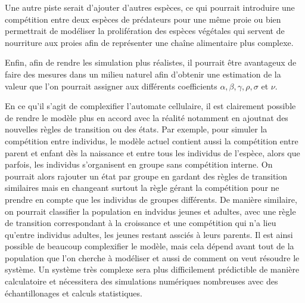 Une autre piste serait d'ajouter d'autres espèces, ce qui pourrait introduire une compétition entre deux espèces de prédateurs pour une même proie ou bien permettrait de modéliser la prolifération des espèces végétales qui servent de nourriture aux proies afin de représenter une chaîne alimentaire plus complexe.

\vspace{0.3cm}
Enfin, afin de rendre les simulation plus réalistes, il pourrait être avantageux de faire des mesures dans un milieu naturel afin d'obtenir une estimation de la valeur que l'on pourrait assigner aux différents coefficients $\alpha, \beta, \gamma, \rho, \sigma$ et $\nu$.

\vspace{0.3cm}
En ce qu'il s'agit de complexifier l'automate cellulaire, il est clairement possible de rendre le modèle plus en accord avec la réalité notamment en ajoutnat des nouvelles règles de transition ou des états. 
Par exemple, pour simuler la compétition entre individus, le modèle actuel contient aussi la compétition entre parent et enfant dès la naissance et entre tous les individus de l'espèce, alors que parfois, les individus s'organisent en groupe sans compétition interne. On pourrait alors rajouter un état par groupe en gardant des règles de transition similaires mais en changeant surtout la règle gérant la compétition pour ne prendre en compte que les individus de groupes différents. 
De manière similaire, on pourrait classifier la population en indvidus jeunes et adultes, avec une règle de transition correspondant à la croissance et une compétition qui n'a lieu qu'entre individus adultes, les jeunes restant assciés à leurs parents. 
Il est ainsi possible de beaucoup complexifier le modèle, mais cela dépend avant tout de la population que l'on cherche à modéliser et aussi de comment on veut résoudre le système. Un système très complexe sera plus difficilement prédictible de manière calculatoire et nécessitera des simulations numériques nombreuses avec des échantillonages et calculs statistiques.
